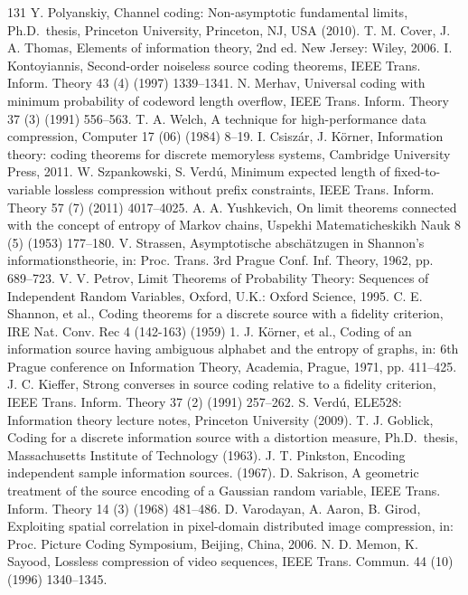 \begin{thebibliography}{131}
 Y. Polyanskiy, Channel coding: Non-asymptotic fundamental limits, Ph.D.\ thesis, Princeton University, Princeton, NJ, USA (2010).
 T. M. Cover, J. A. Thomas, Elements of information theory, 2nd ed. New Jersey: Wiley, 2006.
 I. Kontoyiannis, Second-order noiseless source coding theorems, IEEE Trans. Inform. Theory 43 (4) (1997) 1339--1341.
 N. Merhav, Universal coding with minimum probability of codeword length overflow, IEEE Trans. Inform. Theory 37 (3) (1991) 556--563.
 T. A. Welch, A technique for high-performance data compression, Computer 17 (06) (1984) 8--19.
 I. Csiszár, J. Körner, Information theory: coding theorems for discrete memoryless systems, Cambridge University Press, 2011.
 W. Szpankowski, S. Verdú, Minimum expected length of fixed-to-variable lossless compression without prefix constraints, IEEE Trans. Inform. Theory 57 (7) (2011) 4017--4025.
 A. A. Yushkevich, On limit theorems connected with the concept of entropy of Markov chains, Uspekhi Matematicheskikh Nauk 8 (5) (1953) 177--180.
 V. Strassen, Asymptotische abschätzugen in Shannon’s informationstheorie, in: Proc. Trans. 3rd Prague Conf. Inf. Theory, 1962, pp. 689--723.
 V. V. Petrov, Limit Theorems of Probability Theory: Sequences of Independent Random Variables, Oxford, U.K.: Oxford Science, 1995.
 C. E. Shannon, et al., Coding theorems for a discrete source with a fidelity criterion, IRE Nat. Conv. Rec 4 (142-163) (1959) 1.
 J. Körner, et al., Coding of an information source having ambiguous alphabet and the entropy of graphs, in: 6th Prague conference on Information Theory, Academia, Prague, 1971, pp. 411--425.
 J. C. Kieffer, Strong converses in source coding relative to a fidelity criterion, IEEE Trans. Inform. Theory 37 (2) (1991) 257--262.
 S. Verdú, ELE528: Information theory lecture notes, Princeton University (2009).
 T. J. Goblick, Coding for a discrete information source with a distortion measure, Ph.D.\ thesis, Massachusetts Institute of Technology (1963).
 J. T. Pinkston, Encoding independent sample information sources. (1967).
 D. Sakrison, A geometric treatment of the source encoding of a Gaussian random variable, IEEE Trans. Inform. Theory 14 (3) (1968) 481--486.
 D. Varodayan, A. Aaron, B. Girod, Exploiting spatial correlation in pixel-domain distributed image compression, in: Proc. Picture Coding Symposium, Beijing, China, 2006.
 N. D. Memon, K. Sayood, Lossless compression of video sequences, IEEE Trans. Commun. 44 (10) (1996) 1340--1345.

\end{thebibliography}
